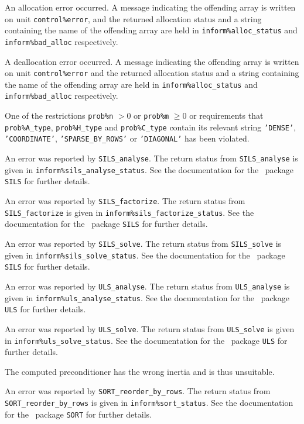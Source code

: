 \documentclass{galahad}
\begin{document}
\begin{description}

 An allocation error occurred.
A message indicating the offending
array is written on unit {\tt control\%error}, and the returned allocation
status and a string containing the name of the offending array
are held in {\tt inform\%alloc\_\-status}
and {\tt inform\%bad\_alloc} respectively.

 A deallocation error occurred.
A message indicating the offending
array is written on unit {\tt control\%error} and the returned allocation
status and a string containing the name of the offending array
are held in {\tt inform\%alloc\_\-status}
and {\tt inform\%bad\_alloc} respectively.

 One of the restrictions
   {\tt prob\%n} $> 0$ or {\tt prob\%m} $\geq  0$
    or requirements that {\tt prob\%A\_type}, {\tt prob\%H\_type} and
    {\tt prob\%C\_type} contain its relevant string
    {\tt 'DENSE'}, {\tt 'COORDINATE'}, {\tt 'SPARSE\_BY\_ROWS'}
    or {\tt 'DIAGONAL'}
    has been violated.


 An error was reported by {\tt SILS\_analyse}. The return
status from {\tt SILS\_analyse} is given in
{\tt inform\%sils\_\-analyse\_status}.
See the documentation for the \galahad\ package {\tt SILS} for further details.

 An error was reported by {\tt SILS\_factorize}.
The return status from {\tt SILS\_factorize} is given in
{\tt inform\%sils\_\-factorize\_status}.
See the documentation for the \galahad\ package {\tt SILS} for further details.

 An error was reported by {\tt SILS\_solve}. The return
status from {\tt SILS\_solve} is given in {\tt inform\%sils\_solve\_\-status}.
See the documentation for the \galahad\ package {\tt SILS} for further details.

 An error was reported by {\tt ULS\_analyse}. The return
status from {\tt ULS\_analyse} is given in {\tt inform\%uls\_analyse\_\-status}.
See the documentation for the \galahad\ package {\tt ULS} for further details.

 An error was reported by {\tt ULS\_solve}. The return
status from {\tt ULS\_solve} is given in {\tt inform\%uls\_solve\_status}.
See the documentation for the \galahad\ package {\tt ULS} for further details.

 The computed preconditioner has the wrong
inertia and is thus unsuitable.

 An error was reported by {\tt SORT\_reorder\_by\_rows}.
The return status from {\tt SORT\_reorder\_by\_rows}
is given in {\tt inform\%sort\_status}.
See the documentation for the \galahad\ package {\tt SORT} for further details.

\end{description}
\end{document}
